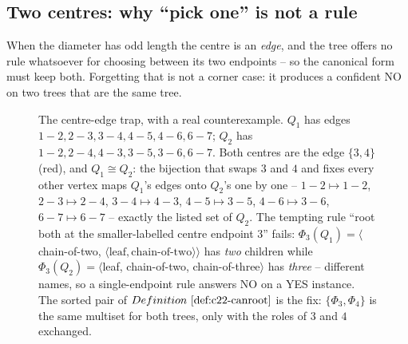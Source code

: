 \subsection{Two centres: why ``pick one'' is not a rule}

When the diameter has odd length the centre is an \emph{edge}, and the tree offers
no rule whatsoever for choosing between its two endpoints -- so the canonical form
must keep both.  Forgetting that is not a corner case: it produces a confident NO
on two trees that are the same tree.

\begin{figure}[H]
\centering
{}
\caption{The centre-edge trap, with a real counterexample.  \(Q_1\) has edges
\(1\!-\!2,2\!-\!3,3\!-\!4,4\!-\!5,4\!-\!6,6\!-\!7\); \(Q_2\) has
\(1\!-\!2,2\!-\!4,4\!-\!3,3\!-\!5,3\!-\!6,6\!-\!7\).  Both centres are the edge
\(\{3,4\}\) (red), and \(Q_1\cong Q_2\): the bijection that swaps \(3\) and
\(4\) and fixes every other vertex maps \(Q_1\)'s edges onto \(Q_2\)'s one by
one -- \(1\!-\!2\!\mapsto\!1\!-\!2\), \(2\!-\!3\!\mapsto\!2\!-\!4\),
\(3\!-\!4\!\mapsto\!4\!-\!3\), \(4\!-\!5\!\mapsto\!3\!-\!5\),
\(4\!-\!6\!\mapsto\!3\!-\!6\), \(6\!-\!7\!\mapsto\!6\!-\!7\) -- exactly the listed
set of \(Q_2\).  The tempting rule ``root both at the smaller-labelled centre endpoint
\(3\)'' fails: \(\Phi_3(Q_1)=\langle\)chain-of-two,
\(\langle\text{leaf},\text{chain-of-two}\rangle\rangle\) has \emph{two} children
while \(\Phi_3(Q_2)=\langle\)leaf, chain-of-two, chain-of-three\(\rangle\) has
\emph{three} -- different names, so a single-endpoint rule answers NO on a YES
instance.  The sorted pair of \(\defref{c22-canroot}\) is the fix:
\(\{\Phi_3,\Phi_4\}\) is the same multiset for both trees, only with the roles of
\(3\) and \(4\) exchanged.}
\label{fig:c22-pair}
\end{figure}

